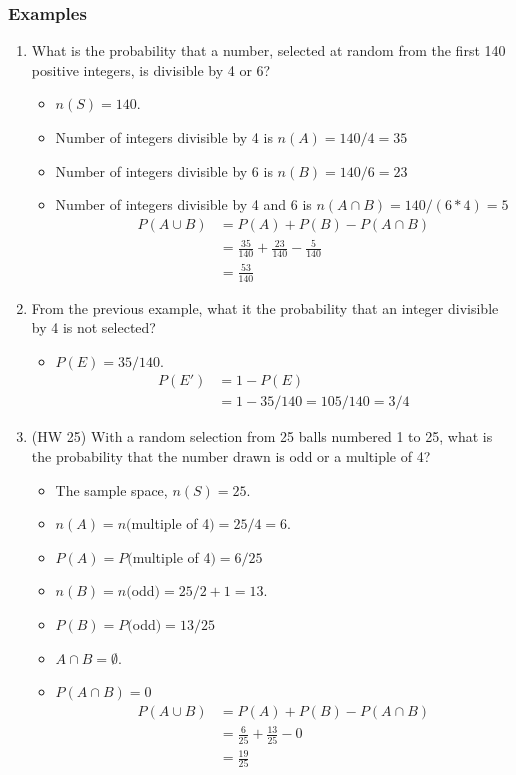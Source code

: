 \documentclass[14pt]{extarticle}
\begin{document}
\subsubsection{Examples}
\begin{enumerate}
	\item What is the probability that a number, selected at random from the first 140 positive integers, is divisible by 4 or 6?
	\begin{itemize}
		\item $n(S)= 140$.
		\item Number of integers divisible by 4 is $n(A) = 140/4 =35$
		\item Number of integers divisible by 6 is $n(B) = 140/6 =23$
		\item Number of integers divisible by 4 and 6 is $n(A\cap B) = 140/(6*4) =5$
		\begin{align*}
			P(A\cup B) &= P(A) + P(B) -P(A\cap B) \\
			& = \frac{35}{140}+ \frac{23}{140} - \frac{5}{140} \\
			& = \frac{53}{140}
		\end{align*}
	\end{itemize}
	\item From the previous example, what it the probability that an integer divisible by 4 is not selected?
	\begin{itemize}
		\item $P(E)= 35/140$.
		\begin{align*}
			P(E') &= 1-P(E) \\
			&= 1-35/140 = 105/140 = 3/4
		\end{align*}
	\end{itemize}
	\item (HW 25) With a random selection from 25 balls numbered 1 to 25, what is the probability that the number drawn is odd or a multiple of 4?
	\begin{itemize}
		\item The sample space, $n(S)=25$.
		\item $n(A) = n($multiple of 4$) = 25/4 = 6$.
		\item $P(A)=P($multiple of 4$) =6/25$
		\item $n(B) = n($odd$) = 25/2+1 = 13$.
		\item $P(B)=P($odd$) =13/25$
		\item $A\cap B = \emptyset$.
		\item $P(A\cap B)=0$
		\begin{align*}
			P(A\cup B) &= P(A) + P(B) -P(A\cap B) \\
			& = \frac{6}{25}+ \frac{13}{25} - 0 \\
			& = \frac{19}{25}
			\end{align*}
	\end{itemize}


\end{enumerate}
\end{document}
